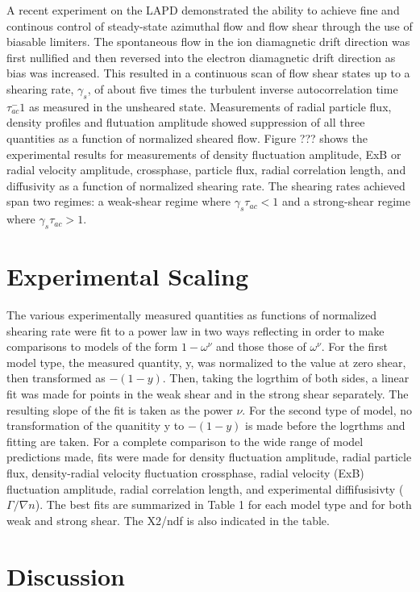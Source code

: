 \documentclass[aip,pop,amsmath,amssymb,reprint,superscriptaddress]{revtex4-1} %
\begin{document}
A recent experiment on the LAPD \cite{schaffner12} demonstrated the ability to achieve fine and continous control of steady-state azimuthal flow and flow shear through the use of biasable limiters. The spontaneous flow in the ion diamagnetic drift direction was first nullified and then reversed into the electron diamagnetic drift direction as bias was increased. This resulted in a continuous scan of flow shear states up to a shearing rate, $\gamma_s$, of about five times the turbulent inverse autocorrelation time  $\tau_{ac}^-1$ as measured in the unsheared state. Measurements of radial particle flux, density profiles and flutuation amplitude showed suppression of all three quantities as a function of normalized sheared flow. Figure ??? shows the experimental results for measurements of density fluctuation amplitude, ExB or radial velocity amplitude, crossphase, particle flux, radial correlation length, and diffusivity as a function of normalized shearing rate. The shearing rates achieved span two regimes: a weak-shear regime where $\gamma_{s}\tau_{ac} < 1$ and a strong-shear regime where $\gamma_{s}\tau_{ac} > 1$.

\section{Experimental Scaling}

The various experimentally measured quantities as functions of normalized shearing rate were fit to a power law in two ways reflecting in order to make comparisons to models of the form $1-\omega^{\nu}$ and those those of $\omega^{\nu}$. For the first model type, the measured quantity, y, was normalized to the value at zero shear, then transformed as $-(1-y)$. Then, taking the logrthim of both sides, a linear fit was made for points in the weak shear and in the strong shear separately. The resulting slope of the fit is taken as the power $\nu$. For the second type of model, no transformation of the quanitity y to $-(1-y)$ is made before the logrthms and fitting are taken. For a complete comparison to the wide range of model predictions made, fits were made for density fluctuation amplitude, radial particle flux, density-radial velocity fluctuation crossphase, radial velocity (ExB) fluctuation amplitude, radial correlation length, and experimental diffifusisivty ($\Gamma/\nabla n$). The best fits are summarized in Table 1 for each model type and for both weak and strong shear. The X2/ndf is also indicated in the table.

\section{Discussion}
\end{document}
